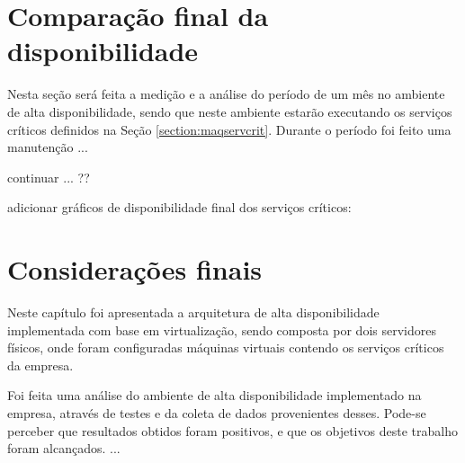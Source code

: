 \section{Comparação final da disponibilidade}
\label{section:comparacaofinal}

Nesta seção será feita a medição e a análise do período de um mês no ambiente de alta disponibilidade, sendo que neste ambiente estarão executando 
os serviços críticos definidos na Seção \ref{section:maqservcrit}.
Durante o período foi feito uma manutenção ...

continuar ... ??

adicionar gráficos de disponibilidade final dos serviços críticos:



\section{Considerações finais}

Neste capítulo foi apresentada a arquitetura de alta disponibilidade implementada com base em virtualização, sendo composta por dois servidores 
físicos, onde foram configuradas máquinas virtuais contendo os serviços críticos da empresa. 

Foi feita uma análise do ambiente de alta disponibilidade implementado na empresa, através de testes e da coleta de dados
provenientes desses. Pode-se perceber que resultados obtidos foram positivos, e que os objetivos deste trabalho foram alcançados. 
...
